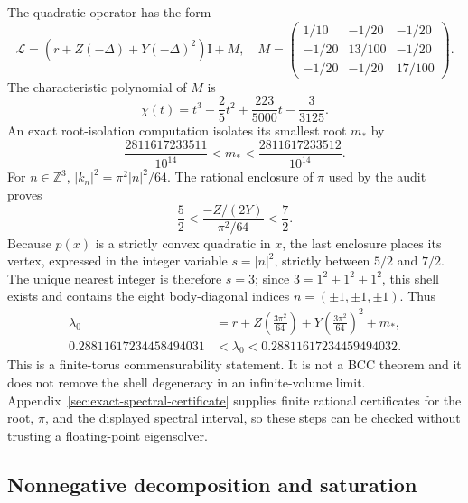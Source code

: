 \documentclass[11pt]{article}
\numberwithin{equation}{section}
\theoremstyle{definition}
\newcommand{\Id}{\mathrm I}
\begin{document}
The quadratic operator has the form
\begin{equation}
 \mathcal L=(r+Z(-\Delta)+Y(-\Delta)^2)\Id+M,
 \quad M=\begin{pmatrix}
 1/10&-1/20&-1/20\\-1/20&13/100&-1/20\\-1/20&-1/20&17/100
 \end{pmatrix}.
 \label{eq:ensemble-L}
\end{equation}
The characteristic polynomial of $M$ is
\begin{equation}
 \chi(t)=t^3-\frac25t^2+\frac{223}{5000}t-\frac3{3125}.
 \label{eq:charpoly}
\end{equation}
An exact root-isolation computation isolates its smallest root $m_*$ by
\begin{equation}
 \frac{2811617233511}{10^{14}}<m_*<
 \frac{2811617233512}{10^{14}}.
 \label{eq:mstar}
\end{equation}
For $n\in\mathbb Z^3$, $|k_n|^2=\pi^2|n|^2/64$.  The rational enclosure of
$\pi$ used by the audit proves
\begin{equation}
 \frac52<\frac{-Z/(2Y)}{\pi^2/64}<\frac72.
 \label{eq:radial-location}
\end{equation}
Because $p(x)$ is a strictly convex quadratic in $x$, the last enclosure
places its vertex, expressed in the integer variable $s=|n|^2$, strictly
between $5/2$ and $7/2$.  The unique nearest integer is therefore $s=3$;
since $3=1^2+1^2+1^2$, this shell exists and contains the eight
body-diagonal indices
$n=(\pm1,\pm1,\pm1)$.  Thus
\begin{equation}
 \begin{aligned}
 \lambda_0&=r+Z\left(\frac{3\pi^2}{64}\right)
      +Y\left(\frac{3\pi^2}{64}\right)^2+m_*,\\
 0.28811617234458494031&<\lambda_0<0.28811617234459494032.
 \end{aligned}
 \label{eq:lambda0}
\end{equation}
This is a finite-torus commensurability statement.  It is not a BCC theorem
and it does not remove the shell degeneracy in an infinite-volume limit.
Appendix~\ref{sec:exact-spectral-certificate} supplies finite rational
certificates for the root, $\pi$, and the displayed spectral interval, so
these steps can be checked without trusting a floating-point eigensolver.

\subsection{Nonnegative decomposition and saturation}
\end{document}

